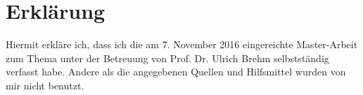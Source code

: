 \newpage
\section*{Erklärung}

Hiermit erkläre ich, dass ich die am 7. November 2016 eingereichte Master-Arbeit zum Thema \makeatletter\emph{\@title} \makeatother unter der Betreuung von Prof. Dr. Ulrich Brehm selbstständig verfasst habe. Andere als die angegebenen Quellen und Hilfsmittel wurden von mir nicht benutzt.

